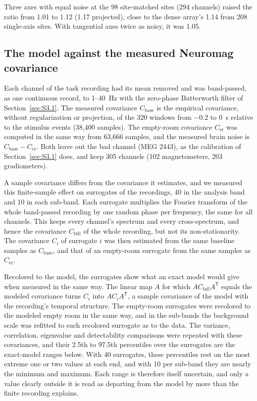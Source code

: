 \documentclass[preprint,12pt,authoryear,a4paper]{elsarticle}
\begin{document}
Three axes with equal noise at the 98 site-matched sites (294 channels) raised the ratio from 1.01 to 1.12 (1.17 projected), close to the dense array's 1.14 from 208 single-axis sites. With tangential axes twice as noisy, it was 1.05.

\subsection{The model against the measured Neuromag covariance}\label{sec:S3.4}

Each channel of the task recording had its mean removed and was band-passed, as one continuous record, to 1–40~Hz with the zero-phase Butterworth filter of Section~\ref{sec:S3.1}. The measured covariance $C_{\mathrm{base}}$ is the empirical covariance, without regularization or projection, of the 320 windows from −0.2 to 0~s relative to the stimulus events (38,400 samples). The empty-room covariance $C_{\mathrm{er}}$ was computed in the same way from 63,666 samples, and the measured brain noise is $C_{\mathrm{base}} - C_{\mathrm{er}}$. Both leave out the bad channel (MEG 2443), as the calibration of Section~\ref{sec:S3.1} does, and keep 305 channels (102 magnetometers, 203 gradiometers).

A sample covariance differs from the covariance it estimates, and we measured this finite-sample effect on surrogates of the recordings, 40 in the analysis band and 10 in each sub-band. Each surrogate multiplies the Fourier transform of the whole band-passed recording by one random phase per frequency, the same for all channels. This keeps every channel's spectrum and every cross-spectrum, and hence the covariance $C_{\mathrm{full}}$ of the whole recording, but not its non-stationarity. The covariance $C_i$ of surrogate $i$ was then estimated from the same baseline samples as $C_{\mathrm{base}}$, and that of an empty-room surrogate from the same samples as $C_{\mathrm{er}}$.

Recolored to the model, the surrogates show what an exact model would give when measured in the same way. The linear map $A$ for which $A C_{\mathrm{full}} A^{\mathsf{T}}$ equals the modeled covariance turns $C_i$ into $A C_i A^{\mathsf{T}}$, a sample covariance of the model with the recording's temporal structure. The empty-room surrogates were recolored to the modeled empty room in the same way, and in the sub-bands the background scale was refitted to each recolored surrogate as to the data. The variance, correlation, eigenvalue and detectability comparisons were repeated with these covariances, and their 2.5th to 97.5th percentiles over the surrogates are the exact-model ranges below. With 40 surrogates, these percentiles rest on the most extreme one or two values at each end, and with 10 per sub-band they are nearly the minimum and maximum. Each range is therefore itself uncertain, and only a value clearly outside it is read as departing from the model by more than the finite recording explains.
\end{document}
